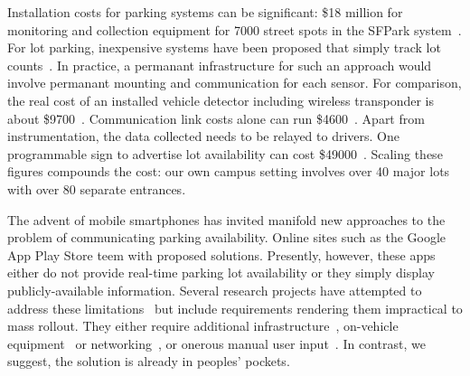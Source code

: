 Installation costs for parking systems can be significant: \$18 million for
monitoring and collection equipment for \num{7000} street spots in the SFPark
system~\cite{sfpark}. For lot parking, inexpensive systems have been proposed
that simply track lot counts~\cite{propst2012embedded}. In practice, a
permanant infrastructure for such an approach would involve permanant
mounting and communication for each sensor. For comparison, the real cost of
an installed vehicle detector including wireless transponder is about
\$\num{9700}~\cite{car-detect}. Communication link costs alone can run
\$\num{4600}~\cite{mstp-park}. Apart from instrumentation, the data collected
needs to be relayed to drivers. One programmable sign to advertise lot
availability can cost \$\num{49000}~\cite{mstp-park}. Scaling these figures
compounds the cost: our own campus setting involves over 40 major lots with
over 80 separate entrances.

The advent of mobile smartphones has invited manifold new approaches to the
problem of communicating parking availability.  Online sites such as the
Google App Play Store teem with proposed solutions.  Presently, however, these
apps either do not provide real-time parking lot availability or they simply
display publicly-available information. Several research projects have
attempted to address these limitations~\cite{4212497, Chen:2012:COS,
Delot:2009:CRP, 5062057, Mathur:2010:PDS} but include requirements rendering
them impractical to mass rollout.  They either require additional
infrastructure~\cite{5062057}, on-vehicle equipment~\cite{Mathur:2010:PDS}
or networking~\cite{Delot:2009:CRP, Mathur:2010:PDS}, or onerous manual user
input~\cite{Chen:2012:COS}. In contrast, we suggest, the solution is already
in peoples' pockets.


